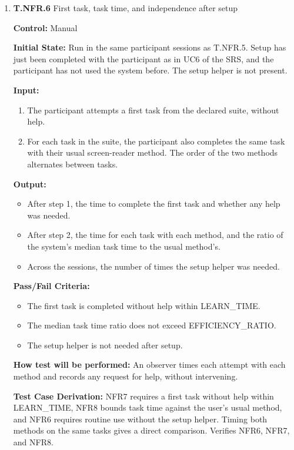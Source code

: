 \documentclass[12pt, titlepage]{article}
\begin{document}
\begin{enumerate}
\item{\textbf{T.NFR.6} First task, task time, and independence after setup\\}\label{test:T.NFR.6}

\textbf{Control:} Manual

\textbf{Initial State:} Run in the same participant sessions as T.NFR.5. Setup has just been completed with the participant as in UC6 of the SRS, and the participant has not used the system before. The setup helper is not present.

\textbf{Input:}
\begin{enumerate}
  \item The participant attempts a first task from the declared suite, without help.
  \item For each task in the suite, the participant also completes the same task with their usual screen-reader method. The order of the two methods alternates between tasks.
\end{enumerate}

\textbf{Output:}
\begin{itemize}
  \item After step 1, the time to complete the first task and whether any help was needed.
  \item After step 2, the time for each task with each method, and the ratio of the system's median task time to the usual method's.
  \item Across the sessions, the number of times the setup helper was needed.
\end{itemize}

\textbf{Pass/Fail Criteria:}
\begin{itemize}
  \item The first task is completed without help within LEARN\_TIME.
  \item The median task time ratio does not exceed EFFICIENCY\_RATIO.
  \item The setup helper is not needed after setup.
\end{itemize}

\textbf{How test will be performed:} An observer times each attempt with each method and records any request for help, without intervening.

\textbf{Test Case Derivation:} NFR7 requires a first task without help within LEARN\_TIME, NFR8 bounds task time against the user's usual method, and NFR6 requires routine use without the setup helper. Timing both methods on the same tasks gives a direct comparison. Verifies NFR6, NFR7, and NFR8.

\end{enumerate}
\end{document}
